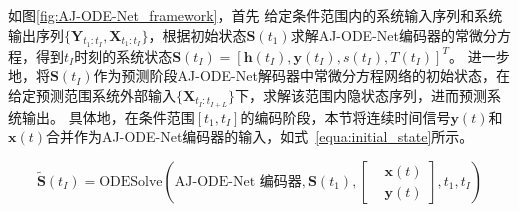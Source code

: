如图\ref{fig:AJ-ODE-Net_framework}，首先
给定条件范围内的系统输入序列和系统输出序列$\{{\boldsymbol{Y}}_{t_{1}:t_{I}}, {\boldsymbol {X}}_{t_{1}:t_{I}}\}$，根据初始状态$\boldsymbol S(t_1)$求解AJ-ODE-Net编码器的常微分方程，得到$t_I$时刻的系统状态$\boldsymbol S(t_I)=[\boldsymbol h(t_I), \boldsymbol y(t_I), s(t_I), T(t_I)]^T$。
进一步地，将$\boldsymbol S(t_I)$作为预测阶段AJ-ODE-Net解码器中常微分方程网络的初始状态，在给定预测范围系统外部输入$\{{\boldsymbol {X}}_{t_{I}:t_{I+L}}\}$下，求解该范围内隐状态序列，进而预测系统输出。
具体地，在条件范围$[t_1, t_I]$的编码阶段，本节将连续时间信号$\boldsymbol y(t)$和$\boldsymbol x(t)$合并作为AJ-ODE-Net编码器的输入，如式~\eqref{equa:initial_state}所示。






\begin{equation}
\boldsymbol{\tilde S}(t_I)=\text{ODESolve}(\text{AJ-ODE-Net 编码器},\boldsymbol S(t_1)
, 
\left [
\begin{aligned} 
&\boldsymbol {x}(t) \\
&\boldsymbol {y}(t)
\end{aligned}
\right ]
, t_1, t_I)
\label{equa:initial_state}
\end{equation}

